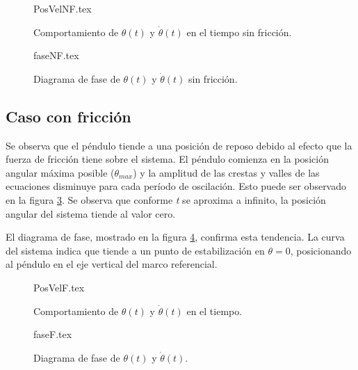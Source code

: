 \begin{figure}[htb!]
 \centering 
 {PosVelNF.tex}
 \caption{Comportamiento de $\theta(t)$ y $\dot{\theta}(t)$ en el tiempo sin fricción.}
 \label{fig: time plot theta dtheta no friction}
\end{figure}

\begin{figure}[htb!]
 \centering 
 {faseNF.tex}
\caption{Diagrama de fase de $\theta(t)$ y $\dot{\theta}(t)$ sin fricción.}
 \label{fig: phase plot theta no friction}
\end{figure}

\pagebreak

\subsection{Caso con fricción}
\label{simulation friction}
Se observa que el péndulo tiende a una posición de reposo debido
al efecto que la fuerza de fricción tiene sobre el sistema.
El péndulo comienza en la posición angular máxima posible 
($\theta_{max}$) y la amplitud de las crestas y valles de las 
ecuaciones disminuye para cada período de oscilación. 
Esto puede ser observado en la figura \ref{fig: time plot theta dtheta friction}.
Se observa que conforme \emph{t} se aproxima a infinito, 
la posición angular del sistema tiende al valor cero.


El diagrama de fase, mostrado en la figura 
\ref{fig: phase plot theta friction}, confirma esta tendencia.
La curva del sistema indica que tiende 
a un punto de estabilización en $\theta = 0$,
posicionando al péndulo en el eje vertical 
del marco referencial.

\begin{figure}[htb!]
 \centering 
 {PosVelF.tex}
 \caption{Comportamiento de $\theta(t)$ y $\dot{\theta}(t)$ en el tiempo.}
 \label{fig: time plot theta dtheta friction}
\end{figure}

\begin{figure}[htb!]
 \centering 
 {faseF.tex}
\caption{Diagrama de fase de $\theta(t)$ y $\dot{\theta}(t)$.}
 \label{fig: phase plot theta friction}
\end{figure}

